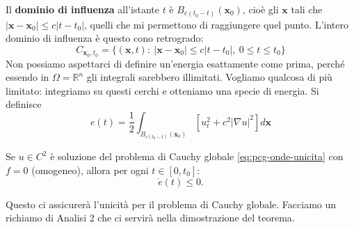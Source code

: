\documentclass[10pt,a4paper,twoside,openright]{book}
\begin{document}
Il \textbf{dominio di influenza} all'istante $t$ è $B_{c( t_{0} -t)}(\mathbf{x}_{0})$, cioè gli $\mathbf{x}$ tali che $| \mathbf{x} -\mathbf{x}_{0}| \leqslant c| t-t_{0}| $, quelli che mi permettono di raggiungere quel punto. L'intero dominio di influenza è questo cono retrogrado:
\begin{equation}
	C_{\mathbf{x}_{0} ,t_{0}} =\{(\mathbf{x} ,t) :\ | \mathbf{x} -\mathbf{x}_{0}| \leqslant c| t-t_{0}| ,\ 0\leqslant t\leqslant t_{0}\}
\end{equation}
Non possiamo aspettarci di definire un'energia esattamente come prima, perché essendo in $\Omega =\mathbb{R}^{n}$ gli integrali sarebbero illimitati. Vogliamo qualcosa di più limitato: integriamo su questi cerchi e otteniamo una specie di energia. Si definisce
\begin{equation}
	e( t) =\frac{1}{2}\int _{B_{c( t_{0} -t)}(\mathbf{x}_{0})}\left[ u_{t}^{2} +c^{2}| \nabla u| ^{2}\right] d\mathbf{x}
	\label{eq:energia-onde-pcg}
\end{equation}
\begin{theorem}
	Se $u\in C^{2}$ è soluzione del problema di Cauchy globale \eqref{eq:pcg-onde-unicita} con $f=0$ (omogeneo), allora per ogni $t\in [ 0,t_{0}]$:
	\begin{equation}
		\dot{e}( t) \leqslant 0.
	\end{equation}
\end{theorem}
Questo ci assicurerà l'unicità per il problema di Cauchy globale.
Facciamo un richiamo di Analisi 2 che ci servirà nella dimostrazione del teorema.
\end{document}
